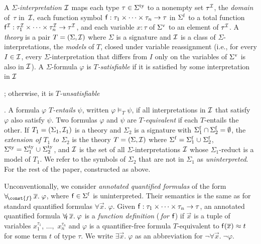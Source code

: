 A \emph{$\Sigma$-interpretation $\mathcal{I}$} %
maps each type $\tau \in \stypes{\Sigma}$ to a nonempty set $\tau^{\mathcal{I}}$,
the \emph{domain} of~$\tau$ in~$\mathcal{I},$
each function symbol $\mathsf{f} : \tau_1 \times \cdots \times \tau_n \rightarrow \tau$ in $\sfuns{\Sigma}$
to a total function $\mathsf{f}^{\mathcal{I}} : \tau_{\smash{1}}^{\mathcal{I}} \times \cdots \times \tau_n^{\mathcal{I}} \rightarrow \tau^{\mathcal{I}}$,
and each variable $x:\tau$ of $\svars{\Sigma}$ to an element of $\tau^{\mathcal{I}}$.
A \emph{theory} is a pair $T = (\Sigma, \Mo)$ where
$\Sigma$ is a signature and ${\mathcal{I}}$ is a class of $\Sigma$-interpretations,
the \emph{models} of $T$, closed under variable reassignment
(i.e., for every $I \in {\mathcal{I}}$, every $\Sigma$-interpretation that differs
from $I$ only on the variables of $\svars \Sigma$ is also in ${\mathcal{I}}$).
A $\Sigma$-formula $\varphi$ is \emph{$T$-satisfiable}
if it is satisfied by some interpretation in ${\mathcal{I}}$\begin{rep};
otherwise, it is \emph{$T$-unsatisfiable}\end{rep}.
A formula $\varphi$ \emph{$T$-entails} $\psi$, written $\varphi \models_T \psi$,
if all interpretations in ${\mathcal{I}}$ that satisfy $\varphi$ also satisfy $\psi$.
Two formulas $\varphi$ and $\psi$ are \emph{$T$-equivalent}
if each $T$-entails the other.
If $T_1 = (\Sigma_1, \Mo_1)$ is a theory and $\Sigma_2$ is a signature
with $\sfuns{\Sigma_1} \cap \sfuns{\Sigma_2} = \emptyset$,
the \emph{extension of $T_1$ to $\Sigma_2$} is the theory $T = (\Sigma, \Mo)$ where
$\sfuns{\Sigma} = \sfuns{\Sigma_1} \cup \sfuns{\Sigma_2}$,
$\stypes{\Sigma} = \stypes{\Sigma_1} \cup \stypes{\Sigma_2}$,
and ${\mathcal{I}}$ is the set of all $\Sigma$-interpretations $\mathcal{I}$
whose $\Sigma_1$-reduct is a model of $T_1$.
We refer to the symbols of $\Sigma_2$ that are not in $\Sigma_1$ as \emph{uninterpreted}.
For the rest of the paper,  constructed as above.

Unconventionally,
we consider \emph{annotated quantified formulas} of the form
$\forallf{\const{f}} \vec x.\; \varphi$, where $\con{f} \in \sfuns{\Sigma}$ is
uninterpreted. Their
semantics is the same as for standard quantified formulas $\forall \vec x.\; \varphi$.
Given $\mathsf{f} : \tau_1 \times \cdots \times \tau_n \rightarrow \tau$,
an annotated
quantified formula $\forall_{\!\mathsf{f}\:} \overline{x}.\; \varphi$ is a \emph{function definition}
(\,\emph{for $\mathsf{f}$}\vthinspace) if $\vec x$ is a tuple of variables
$x_1^{\tau_1}$, $\dotsc,$ $x_n^{\tau_n}$
and $\varphi$ is a quantifier-free formula
$T$-equivalent to $\mathsf{f}( \overline{x} ) \approx t$ for some term $t$ of type $\tau$.
We write $\exists
\vec x.\; \varphi$ as an abbreviation for $\neg \forall \vec x.\; \neg \varphi$.


